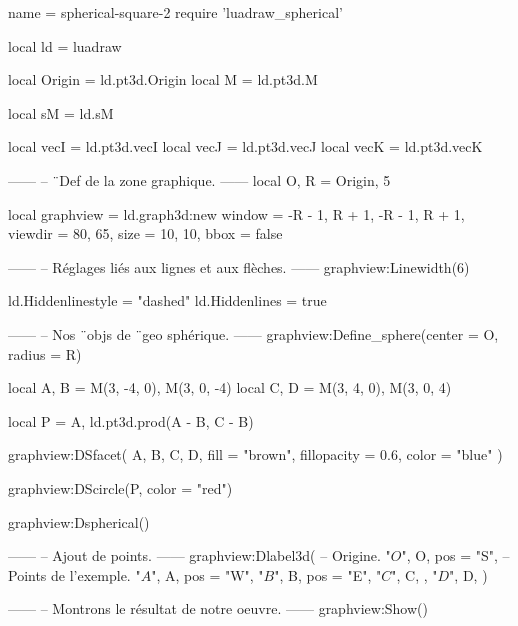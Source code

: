 \documentclass[border = 3pt]{standalone}
\begin{document}
\begin{luadraw*}{name = spherical-square-2}
require 'luadraw_spherical'

local ld = luadraw

local Origin = ld.pt3d.Origin
local M      = ld.pt3d.M

local sM = ld.sM

local vecI = ld.pt3d.vecI
local vecJ = ld.pt3d.vecJ
local vecK = ld.pt3d.vecK

------
-- ¨Def de la zone graphique.
------
local O, R = Origin, 5

local graphview = ld.graph3d:new{
  window  = {-R - 1, R + 1, -R - 1, R + 1},
  viewdir = {80, 65},
  size    = {10, 10},
  bbox    = false
}

------
-- Réglages liés aux lignes et aux flèches.
------
graphview:Linewidth(6)

ld.Hiddenlinestyle = "dashed"
ld.Hiddenlines     = true

------
-- Nos ¨objs de ¨geo sphérique.
------
graphview:Define_sphere({center = O, radius = R})

local A, B = M(3, -4, 0), M(3, 0, -4)
local C, D = M(3, 4, 0), M(3, 0, 4)

local P = {A, ld.pt3d.prod(A - B, C - B)}

graphview:DSfacet(
  {A, B, C, D},
  {fill = "brown", fillopacity = 0.6, color = "blue"}
)

graphview:DScircle(P, {color = "red"})

graphview:Dspherical()

------
-- Ajout de points.
------
graphview:Dlabel3d(
-- Origine.
  "$O$", O, {pos = "S"},
-- Points de l'exemple.
  "$A$", A, {pos = "W"},
  "$B$", B, {pos = "E"},
  "$C$", C, {},
  "$D$", D, {}
)

------
-- Montrons le résultat de notre oeuvre.
------
graphview:Show()
\end{luadraw*}
\end{document}
